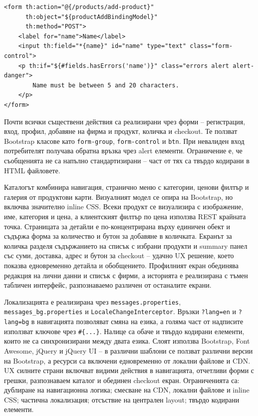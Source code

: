 \begin{lstlisting}[caption={Типичен Thymeleaf фрагмент за форма},label={lst:thymeleaf-form}]
<form th:action="@{/products/add-product}"
      th:object="${productAddBindingModel}"
      th:method="POST">
    <label for="name">Name</label>
    <input th:field="*{name}" id="name" type="text" class="form-control">
    <p th:if="${#fields.hasErrors('name')}" class="errors alert alert-danger">
        Name must be between 5 and 20 characters.
    </p>
</form>
\end{lstlisting}

Почти всички съществени действия са реализирани чрез форми -- регистрация, вход, профил, добавяне на фирма и продукт, количка и checkout. Те ползват Bootstrap класове като \texttt{form-group}, \texttt{form-control} и \texttt{btn}. При невалиден вход потребителят получава обратна връзка чрез alert елементи. Ограничение е, че съобщенията не са напълно стандартизирани -- част от тях са твърдо кодирани в HTML файловете.

Каталогът комбинира навигация, странично меню с категории, ценови филтър и галерия от продуктови карти. Визуалният модел се опира на Bootstrap, но включва значително inline CSS. Всеки продукт се визуализира с изображение, име, категория и цена, а клиентският филтър по цена използва REST крайната точка. Страницата за детайли е по-концентрирана върху единичен обект и съдържа форма за количество и бутон за добавяне в количката. Екранът за количка разделя съдържанието на списък с избрани продукти и summary панел със суми, доставка, адрес и бутон за checkout -- удачно UX решение, което показва едновременно детайла и обобщението. Профилният екран обединява редакция на лични данни и списък с фирми, а историята е реализирана с тъмен табличен интерфейс, разпознаваемо различен от останалите екрани.

Локализацията е реализирана чрез \texttt{messages.properties}, \texttt{messages\_bg.properties} и \texttt{LocaleChangeInterceptor}. Връзки \texttt{?lang=en} и \texttt{?lang=bg} в навигацията позволяват смяна на езика, а голяма част от надписите използват ключове чрез \texttt{\#\{...\}}. Налице са обаче и твърдо кодирани елементи, които не са синхронизирани между двата езика. Слоят използва Bootstrap, Font Awesome, jQuery и jQuery UI \cite{bootstrap,jquery} -- в различни шаблони се ползват различни версии на Bootstrap, а ресурси са включени едновременно от локални файлове и CDN. UX силните страни включват видими действия в навигацията, отчетливи форми с грешки, разпознаваем каталог и обединен checkout екран. Ограниченията са: дублиране на навигационна логика; смесване на CDN, локални файлове и inline CSS; частична локализация; отсъствие на централен layout; твърдо кодирани елементи.

